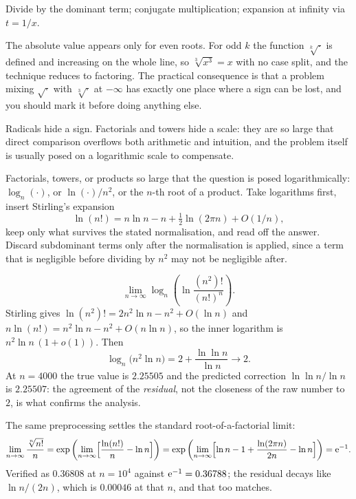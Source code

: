 \begin{seealsob}Divide by the dominant term; conjugate multiplication; expansion at infinity via $t=1/x$.\end{seealsob}

The absolute value appears only for even roots. For odd $k$ the function $\sqrt[k]{\cdot}$ is defined and increasing on the whole line, so $\sqrt[3]{x^{3}}=x$ with no case split, and the technique reduces to factoring. The practical consequence is that a problem mixing $\sqrt{\cdot}$ with $\sqrt[3]{\cdot}$ at $-\infty$ has exactly one place where a sign can be lost, and you should mark it before doing anything else.

Radicals hide a sign. Factorials and towers hide a scale: they are so large that direct comparison overflows both arithmetic and intuition, and the problem itself is usually posed on a logarithmic scale to compensate.

\cue Factorials, towers, or products so large that the question is posed logarithmically: $\log_{n}(\cdot)$, or $\ln(\cdot)/n^{2}$, or the $n$-th root of a product.
\method Take logarithms first, insert Stirling's expansion
\[
\ln(n!)=n\ln n-n+\tfrac12\ln(2\pi n)+O(1/n),
\]
keep only what survives the stated normalisation, and read off the answer. Discard subdominant terms only after the normalisation is applied, since a term that is negligible before dividing by $n^{2}$ may not be negligible after.

\begin{worked}
\[
\lim_{n\to\infty}\log_{n}\!\left(\ln\frac{(n^{2})!}{(n!)^{n}}\right).
\]
Stirling gives $\ln (n^{2})!=2n^{2}\ln n-n^{2}+O(\ln n)$ and $n\ln(n!)=n^{2}\ln n-n^{2}+O(n\ln n)$, so the inner logarithm is $n^{2}\ln n\,(1+o(1))$. Then
\[
\log_{n}\bigl(n^{2}\ln n\bigr)=2+\frac{\ln\ln n}{\ln n}\longrightarrow 2 .
\]
At $n=4000$ the true value is $2.25505$ and the predicted correction $\ln\ln n/\ln n$ is $2.25507$: the agreement of the \emph{residual}, not the closeness of the raw number to $2$, is what confirms the analysis.

The same preprocessing settles the standard root-of-a-factorial limit:
\[
\lim_{n\to\infty}\frac{\sqrt[n]{n!}}{n}
=\exp\left(\lim_{n\to\infty}\Bigl[\frac{\ln(n!)}{n}-\ln n\Bigr]\right)
=\exp\left(\lim_{n\to\infty}\Bigl[\ln n-1+\frac{\ln(2\pi n)}{2n}-\ln n\Bigr]\right)=\mathrm{e}^{-1}.
\]
Verified as $0.36808$ at $n=10^{4}$ against $\mathrm{e}^{-1}=0.36788$; the residual decays like $\ln n/(2n)$, which is $0.00046$ at that $n$, and that too matches.
\end{worked}

